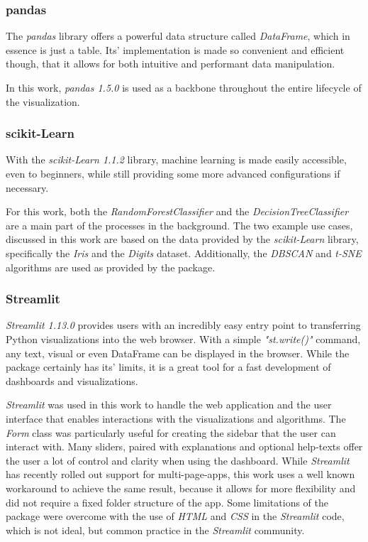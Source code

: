 \documentclass[a4paper, 12pt]{article}
\begin{document}
\subsubsection{pandas}
The \textit{pandas} library offers a powerful data structure called \textit{DataFrame}, which in
essence is just a table. Its' implementation is made so convenient and efficient though, that it
allows for both intuitive and performant data manipulation. \par
In this work, \textit{pandas 1.5.0} is used as a backbone throughout the entire lifecycle of the
visualization.

\subsubsection{scikit-Learn}
With the \textit{scikit-Learn 1.1.2} library, machine learning is made easily accessible, even to
beginners, while still providing some more advanced configurations if necessary. \par
For this work, both the \textit{RandomForestClassifier} and the \textit{DecisionTreeClassifier}
are a main part of the processes in the background. The two example use cases, discussed in this
work are based on the data provided by the \textit{scikit-Learn} library, specifically the
\textit{Iris} and the \textit{Digits} dataset. Additionally, the \textit{DBSCAN}
\cite{ester1996density} and \textit{t-SNE} \cite{JMLR:v9:vandermaaten08a} algorithms are used as
provided by the package.

\subsubsection{Streamlit}
\textit{Streamlit 1.13.0} provides users with an incredibly easy entry point to transferring Python
visualizations into the web browser. With a simple \textit{"st.write()"} command, any text,
visual or even {DataFrame} can be displayed in the browser. While the package certainly has its'
limits, it is a great tool for a fast development of dashboards and visualizations. \par
\textit{Streamlit} was used in this work to handle the web application and the user interface
that enables interactions with the visualizations and algorithms. The \textit{Form} class was
particularly useful for creating the sidebar that the user can interact with. Many sliders, paired
with explanations and optional help-texts offer the user a lot of control and clarity when using
the dashboard.
While \textit{Streamlit} has
recently rolled out support for multi-page-apps, this work uses a well known workaround to
achieve the same result, because it allows for more flexibility and did not require a fixed folder
structure of the app.
Some limitations of the package were overcome with the use of \textit{HTML} and \textit{CSS} in
the \textit{Streamlit} code, which is not ideal, but common practice in the \textit{Streamlit}
community.
\end{document}

